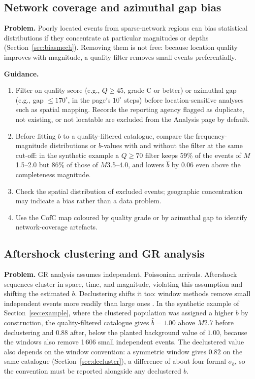 \documentclass[12pt]{article}
\begin{document}
\subsection{Network coverage and azimuthal gap bias}

\textbf{Problem.}  Poorly located events from sparse-network regions can bias
statistical distributions if they concentrate at particular magnitudes or
depths (Section~\ref{sec:biasmech}).  Removing them is not free: because location
quality improves with magnitude, a quality filter removes small events
preferentially.

\textbf{Guidance.}
\begin{enumerate}[leftmargin=*]
  \item Filter on quality score (e.g., $Q \geq 45$, grade C or better) or
    azimuthal gap (e.g., gap $\leq 170^{\circ}$, in the page's $10^{\circ}$
    steps) before location-sensitive analyses such as spatial mapping.  Records
    the reporting agency flagged as duplicate, not existing, or not locatable are
    excluded from the Analysis page by default.
  \item Before fitting $b$ to a quality-filtered catalogue, compare the
    frequency-magnitude distributions or $b$-values with and without the filter
    at the same cut-off: in the synthetic example a $Q \geq 70$ filter keeps 59\%
    of the events of $M$1.5--2.0 but 86\% of those of $M$3.5--4.0, and lowers
    $\hat{b}$ by 0.06 even above the completeness magnitude.
  \item Check the spatial distribution of excluded events; geographic
    concentration may indicate a bias rather than a data problem.
  \item Use the CofC map coloured by quality grade or by azimuthal gap to
    identify network-coverage artefacts.
\end{enumerate}

\subsection{Aftershock clustering and GR analysis}

\textbf{Problem.}  GR analysis assumes independent, Poissonian arrivals.
Aftershock sequences cluster in space, time, and magnitude, violating this
assumption and shifting the estimated $b$.  Declustering shifts it too: window
methods remove small independent events more readily than large ones
\citep{mizrahi2021}.  In the synthetic example of Section~\ref{sec:example}, where
the clustered population was assigned a higher $b$ by construction, the
quality-filtered catalogue gives $\hat{b} = 1.00$ above $M$2.7 before
declustering and $0.88$ after, below the planted background value of $1.00$,
because the windows also remove 1\,606 small independent events.  The
declustered value also depends on the window convention: a symmetric window
gives $0.82$ on the same catalogue (Section~\ref{sec:decluster}), a difference of
about four formal $\sigma_b$, so the convention must be reported alongside any
declustered $b$.
\end{document}

